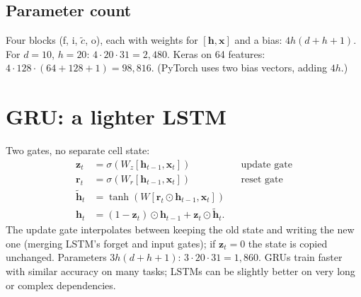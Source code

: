 \subsection{Parameter count}
Four blocks (f, i, $\tilde c$, o), each with weights for $[\mathbf h,\mathbf x]$ and a bias: $4h(d + h + 1)$. For $d = 10$, $h = 20$: $4\cdot20\cdot31 = 2{,}480$.
Keras  on 64 features: $4\cdot128\cdot(64 + 128 + 1) = 98{,}816$. (PyTorch uses two bias vectors, adding $4h$.)

\section{GRU: a lighter LSTM}
Two gates, no separate cell state:
\begin{align*}
\mathbf z_t &= \sigma(W_z[\mathbf h_{t-1},\mathbf x_t]) &&\text{update gate}\\
\mathbf r_t &= \sigma(W_r[\mathbf h_{t-1},\mathbf x_t]) &&\text{reset gate}\\
\tilde{\mathbf h}_t &= \tanh(W[\mathbf r_t\odot\mathbf h_{t-1},\mathbf x_t])\\
\mathbf h_t &= (1 - \mathbf z_t)\odot\mathbf h_{t-1} + \mathbf z_t\odot\tilde{\mathbf h}_t.
\end{align*}
The update gate interpolates between keeping the old state and writing the new one (merging LSTM's forget and input gates); if $\mathbf z_t = 0$ the state is copied
unchanged. Parameters $3h(d + h + 1)$: $3\cdot20\cdot31 = 1{,}860$. GRUs train faster with similar accuracy on many tasks; LSTMs can be slightly better on very
long or complex dependencies.

